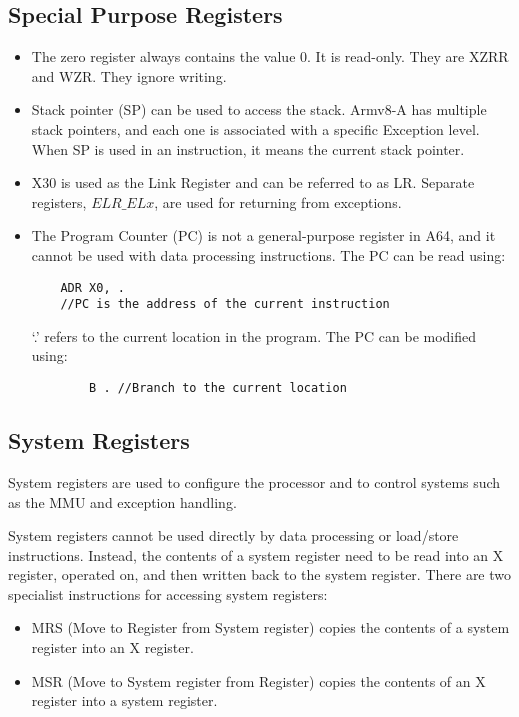 \documentclass[letterpaper,12pt]{article}
\begin{document}
\subsection{Special Purpose Registers}
\begin{itemize}
    \item The zero register always contains the value 0. It is read-only. They are XZRR and WZR. They ignore writing.
    \item Stack pointer (SP) can be used to access the stack.  Armv8-A has multiple stack pointers, and each one is associated with a specific Exception level. When SP is used in an instruction, it means the current stack pointer. 
    \item X30 is used as the Link Register and can be referred to as LR. Separate registers, $ELR\_ELx$, are used for returning from exceptions.
    \item The Program Counter (PC) is not a general-purpose register in A64, and it cannot be used with data processing instructions. The PC can be read using: 
    
    \begin{lstlisting}
    ADR X0, . 
    //PC is the address of the current instruction
    \end{lstlisting}
    
    `.' refers to the current location in the program. The PC can be modified using: \begin{lstlisting}
        B . //Branch to the current location
    \end{lstlisting}
\end{itemize}

\subsection{System Registers}
System registers are used to configure the processor and to control systems such as the MMU and exception handling.

System registers cannot be used directly by data processing or load/store instructions. Instead, the contents of a system register need to be read into an X register, operated on, and then written back to the system register. There are two specialist instructions for accessing system registers:

\begin{itemize}
    \item MRS (Move to Register from System register) copies the contents of a system register into an X register.
    \item MSR (Move to System register from Register) copies the contents of an X register into a system register.
\end{itemize}
\end{document}
